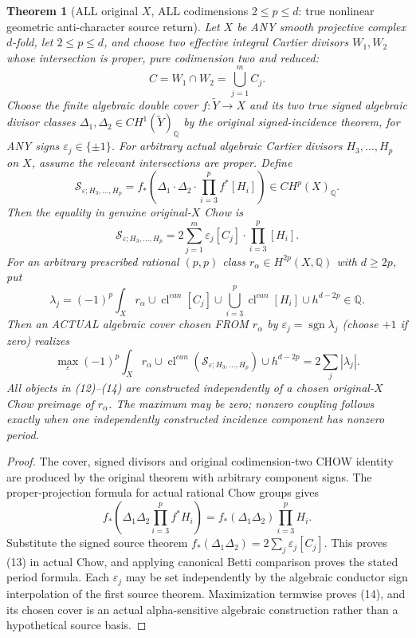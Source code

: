 \documentclass[11pt]{article}
\newtheorem{theorem}{Theorem}
\begin{document}
\begin{theorem}[ALL original $X$, ALL codimensions $2\le p\le d$: true nonlinear geometric anti-character source return]
Let $X$ be ANY smooth projective complex $d$-fold,
let $2\le p\le d$, and choose two effective integral
Cartier divisors $W_1,W_2$ whose intersection is
proper, pure codimension two and reduced:
\[
 C=W_1\cap W_2=\bigcup_{j=1}^{m}C_j.
\]
Choose the finite algebraic double cover $f:\widetilde
Y\to X$ and its two true signed algebraic
divisor classes $\Delta_1,\Delta_2\in
CH^1(\widetilde Y)_{\mathbb Q}$ by the original
signed-incidence theorem, for ANY signs
$\varepsilon_j\in\{\pm1\}$.
For arbitrary actual algebraic Cartier divisors
$H_3,\ldots,H_p$ on $X$, assume the relevant
intersections are proper. Define
\[
 \boxed{
 \mathcal S_{\varepsilon;H_3,\ldots,H_p}
 =f_*\!\left(
    \Delta_1\cdot\Delta_2
    \cdot\prod_{i=3}^{p}f^*[H_i]
       \right)\in CH^p(X)_{\mathbb Q}.}       \tag{12}
\]
Then the equality in genuine original-$X$ Chow is
\[
 \boxed{
 \mathcal S_{\varepsilon;H_3,\ldots,H_p}
 =2\sum_{j=1}^{m}\varepsilon_j
       [C_j]\cdot\prod_{i=3}^{p}[H_i].
 }                                           \tag{13}
\]
For an arbitrary prescribed rational $(p,p)$
class $r_\alpha\in H^{2p}(X,\mathbb Q)$
with $d\ge2p$, put
\[
 \lambda_j=(-1)^p
  \int_X r_\alpha\cup\operatorname{cl}^{can}[C_j]
       \cup\bigcup_{i=3}^{p}
         \operatorname{cl}^{can}[H_i]
       \cup h^{d-2p}\in\mathbb Q .
\]
Then an ACTUAL algebraic cover chosen FROM
$r_\alpha$ by $\varepsilon_j=\operatorname{sgn}
\lambda_j$ (choose $+1$ if zero) realizes
\[
 \boxed{
 \max_\varepsilon (-1)^p
  \int_X r_\alpha\cup
       \operatorname{cl}^{can}
         (\mathcal S_{\varepsilon;H_3,\ldots,H_p})
       \cup h^{d-2p}
       =2\sum_j|\lambda_j|.}                 \tag{14}
\]
All objects in (12)--(14) are constructed
independently of a chosen original-$X$
Chow preimage of $r_\alpha$. The maximum may
be zero; nonzero coupling follows exactly
when one independently constructed incidence
component has nonzero period.
\end{theorem}
\begin{proof}
The cover, signed divisors and original
codimension-two CHOW identity are produced
by the original theorem with arbitrary
component signs. The proper-projection formula
for actual rational Chow groups gives
\[
 f_*\left(\Delta_1\Delta_2
              \prod_{i=3}^{p} f^*H_i\right)
 =f_*(\Delta_1\Delta_2)
                   \prod_{i=3}^{p} H_i.
\]
Substitute the signed source theorem
$f_*(\Delta_1\Delta_2)=
  2\sum_j\varepsilon_j[C_j]$.
This proves (13) in actual Chow,
and applying canonical Betti comparison proves
the stated period formula. Each
$\varepsilon_j$ may be set independently by
the algebraic conductor sign interpolation
of the first source theorem. Maximization
termwise proves (14), and its chosen cover
is an actual alpha-sensitive algebraic
construction rather than a hypothetical
source basis.
\end{proof}
\end{document}
